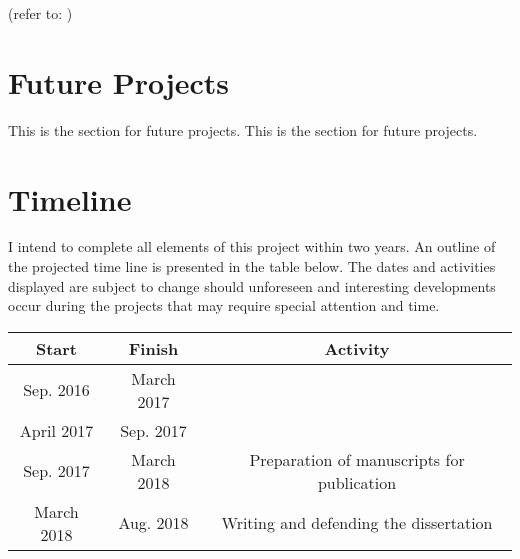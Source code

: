 \documentclass[12pt]{article}
\begin{document}
(refer to: \citet{soldner04})
\clearpage
\section{Future Projects}
This is the section for future projects.
This is the section for future projects.

\clearpage
\section{Timeline}
I intend to complete all elements of this project within two years. An outline of the projected time line is presented in the table below. The dates and activities displayed are subject to change should
unforeseen and interesting developments occur during the projects that may require special attention and time.

\begin{table}[h]
    \begin{center}
        \begin{tabular}{|c|c|c|}
            \hline
            Start&Finish&Activity\\
            \hline
            Sep. 2016& March 2017 &  \\
            \hline
            April 2017 & Sep. 2017 &   \\
            \hline
            Sep. 2017 & March 2018 & Preparation of manuscripts for publication \\
            \hline
            March 2018 & Aug. 2018& Writing and defending the dissertation   \\
            \hline
        \end{tabular}
    \end{center}

\end{table}

\clearpage


\end{document}
